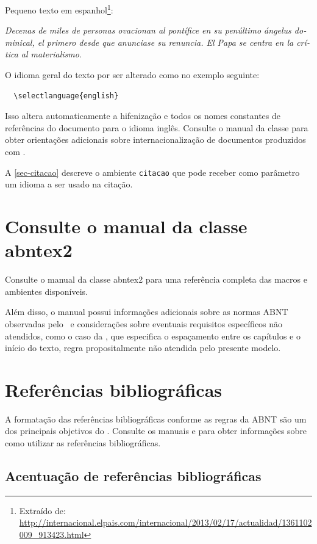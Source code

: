 Pequeno texto em espanhol\footnote{Extraído de:
\url{http://internacional.elpais.com/internacional/2013/02/17/actualidad/1361102009_913423.html}}:

\foreignlanguage{spanish}{\textit{Decenas de miles de personas ovacionan al pontífice en su
penúltimo ángelus dominical, el primero desde que anunciase su renuncia. El Papa se
centra en la crítica al materialismo}}.

O idioma geral do texto por ser alterado como no exemplo seguinte:

\begin{verbatim}
  \selectlanguage{english}
\end{verbatim}

Isso altera automaticamente a hifenização e todos os nomes constantes de
referências do documento para o idioma inglês. Consulte o manual da classe
\cite{abntex2classe} para obter orientações adicionais sobre internacionalização de
documentos produzidos com \abnTeX.

A \autoref{sec-citacao} descreve o ambiente \texttt{citacao} que pode receber
como parâmetro um idioma a ser usado na citação.

\section{Consulte o manual da classe \textsf{abntex2}}

Consulte o manual da classe \textsf{abntex2} \cite{abntex2classe} para uma
referência completa das macros e ambientes disponíveis. 

Além disso, o manual possui informações adicionais sobre as normas ABNT
observadas pelo \abnTeX\ e considerações sobre eventuais requisitos específicos
não atendidos, como o caso da , que
especifica o espaçamento entre os capítulos e o início do texto, regra
propositalmente não atendida pelo presente modelo.

\section{Referências bibliográficas}

A formatação das referências bibliográficas conforme as regras da ABNT são um
dos principais objetivos do \abnTeX. Consulte os manuais
 e  para obter informações
sobre como utilizar as referências bibliográficas.

\subsection{Acentuação de referências bibliográficas}

